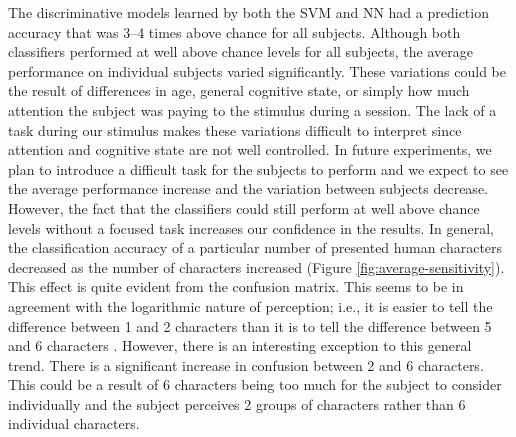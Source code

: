 \documentclass[preprint,5p,authoryear]{elsarticle}
\begin{document}
The discriminative models learned by both the SVM and NN had a prediction accuracy that was 3--4 times above chance for all subjects.
Although both classifiers performed at well above chance levels for all subjects, the average performance on individual subjects varied significantly.
These variations could be the result of differences in age, general cognitive state, or simply how much attention the subject was paying to the stimulus during a session.
The lack of a task during our stimulus makes these variations difficult to interpret since attention and cognitive state are not well controlled.
In future experiments, we plan to introduce a difficult task for the subjects to perform and we expect to see the average performance increase and the variation between subjects decrease.
However, the fact that the classifiers could still perform at well above chance levels without a focused task increases our confidence in the results.
In general, the classification accuracy of a particular number of presented human characters decreased as the number of characters increased (Figure \ref{fig:average-sensitivity}).
This effect is quite evident from the confusion matrix.
This seems to be in agreement with the logarithmic nature of perception; i.e., it is easier to tell the difference between 1 and 2 characters than it is to tell the difference between 5 and 6 characters \citep{Shepard1975,Dehaene2003}.
However, there is an interesting exception to this general trend.
There is a significant increase in confusion between 2 and 6 characters.
This could be a result of 6 characters being too much for the subject to consider individually and the subject perceives 2 groups of characters rather than 6 individual characters.
\end{document}
